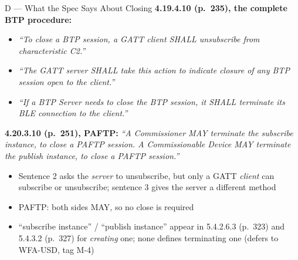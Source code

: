 \documentclass[10pt,aspectratio=169,t]{beamer}
\newcommand{\spec}[1]{\textcolor{blue!50!black}{\small\itshape #1}}
\begin{document}
\begin{frame}{D --- What the Spec Says About Closing}
\small
\textbf{4.19.4.10 (p.~235), the complete BTP procedure:}
\begin{itemize}
  \item \spec{``To close a BTP session, a GATT client SHALL unsubscribe from
        characteristic C2.''}
  \item \spec{``The GATT server SHALL take this action to indicate closure of
        any BTP session open to the client.''}
  \item \spec{``If a BTP Server needs to close the BTP session, it SHALL
        terminate its BLE connection to the client.''}
\end{itemize}
\textbf{4.20.3.10 (p.~251), PAFTP:} \spec{``A Commissioner MAY terminate the
subscribe instance, to close a PAFTP session. A Commissionable Device MAY
terminate the publish instance, to close a PAFTP session.''}
\vspace{2pt}
\begin{itemize}
  \item Sentence 2 asks the \emph{server} to unsubscribe, but only a GATT
        \emph{client} can subscribe or unsubscribe; sentence 3 gives the server
        a different method
  \item PAFTP: both sides MAY, so no close is required
  \item ``subscribe instance'' / ``publish instance'' appear in 5.4.2.6.3
        (p.~323) and 5.4.3.2 (p.~327) for \emph{creating} one; none defines
        terminating one (defers to WFA-USD, tag M-4)
\end{itemize}
\end{frame}
\end{document}
